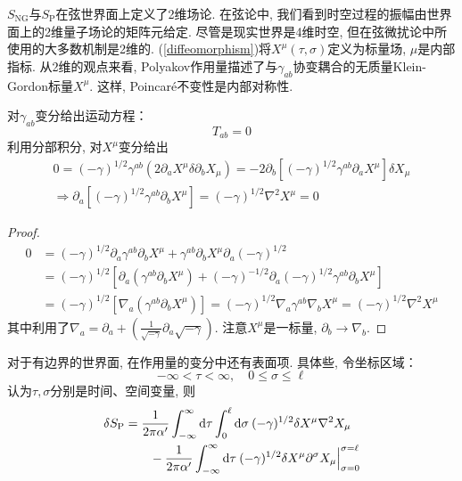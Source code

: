 $S_{\mathrm{NG}}$与$S_{\mathrm{P}}$在弦世界面上定义了2维场论. 在弦论中, 我们看到时空过程的振幅由世界面上的2维量子场论的矩阵元给定. 尽管是现实世界是4维时空, 但在弦微扰论中所使用的大多数机制是2维的. (\ref{diffeomorphism})将$X^\mu(\tau,\sigma)$定义为标量场, $\mu$是内部指标. 从2维的观点来看, Polyakov作用量描述了与$\gamma_{ab}$协变耦合的无质量Klein-Gordon标量$X^\mu$. 这样, Poincar\'{e}不变性是内部对称性. 

对$\gamma_{ab}$变分给出运动方程：
\begin{equation}
T_{ab}=0
\end{equation}
利用分部积分, 对$X^\mu$变分给出
\begin{gather}
0=(-\gamma)^{1/2}\gamma^{ab}(2\partial_a X^\mu\delta\partial_b X_\mu)
=-2\partial_b[(-\gamma)^{1/2}\gamma^{ab}\partial_a X^\mu]\delta X_\mu \nonumber \\
\Longrightarrow\partial_a[(-\gamma)^{1/2}\gamma^{ab}\partial_b X^\mu]=(-\gamma)^{1/2}\nabla^2 X^\mu=0
\end{gather}
\begin{proof}
\begin{align}
    0&=(-\gamma)^{1/2}\partial_a \gamma^{ab}\partial_b X^\mu +\gamma^{ab}\partial_b X^\mu \partial_a(-\gamma)^{1/2} \nonumber \\
    &=(-\gamma)^{1/2}[\partial_a (\gamma^{ab}\partial_b X^\mu )+(-\gamma)^{-1/2}\partial_a(-\gamma)^{1/2}\gamma^{ab}\partial_b X^\mu ] \nonumber \\
    &=(-\gamma)^{1/2}[\nabla_a (\gamma^{ab}\partial_b X^\mu )]=(-\gamma)^{1/2}\nabla_a \gamma^{ab}\nabla_b X^\mu =(-\gamma)^{1/2}\nabla^2 X^\mu \nonumber
    \end{align}
    其中利用了$\nabla_a=\partial_a+(\frac{1}{\sqrt{-\gamma}}\partial_a\sqrt{-\gamma})$.
    注意$X^\mu$是一标量, $\partial_b\rightarrow \nabla_b$.
\end{proof}
对于有边界的世界面, 在作用量的变分中还有表面项. 具体些, 令坐标区域：
\begin{equation}
-\infty<\tau<\infty, \quad 0 \leq \sigma \leq \ell
\end{equation}
认为$\tau,\sigma$分别是时间、空间变量, 则
\begin{align}
\delta S_{\mathrm{P}}&=\frac{1}{2 \pi \alpha^{\prime}} \int_{-\infty}^{\infty} \mathrm{d}\tau \int_{0}^{\ell} \mathrm{d}\sigma\:(-\gamma)^{1 / 2} \delta X^{\mu} \nabla^{2} X_{\mu} \nonumber  \\
&\qquad -\frac{1}{2 \pi \alpha^{\prime}} \int_{-\infty}^{\infty} \mathrm{d} \tau\: (-\gamma)^{1 / 2} \delta X^{\mu}
 \partial^{\sigma} X_{\mu}\Big\rvert_{\sigma=0}^{\sigma=\ell}
\end{align}
